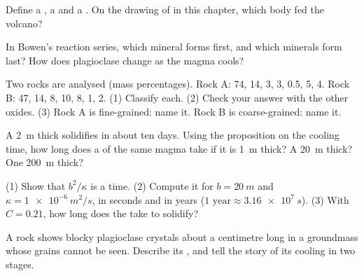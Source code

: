 \begin{exercise}[$\star$]\label{exo:g11:igneous-rocks:4}
Define a , a  and a . On the drawing of  in this
chapter, which body fed the volcano?
\end{exercise}

\begin{exercise}[$\star$]\label{exo:g11:igneous-rocks:5}
In Bowen's reaction series, which mineral forms first, and which minerals
form last? How does plagioclase change as the magma cools?
\end{exercise}

\begin{exercise}[$\star\star$]\label{exo:g11:igneous-rocks:6}
Two rocks are analysed (mass percentages). Rock A:  74, 
14,  3,  3,  0.5,  5,  4. Rock B:
 47,  14,  8,  10,  8, 
1,  2. (1) Classify each. (2) Check your answer with the other
oxides. (3) Rock A is fine-grained: name it. Rock B is coarse-grained: name
it.
\end{exercise}

\begin{exercise}[$\star\star$]\label{exo:g11:igneous-rocks:7}
A  \qty{2}{m} thick solidifies in about ten days. Using the proposition
on the cooling time, how long does a  of the same magma take if it is
\qty{1}{m} thick? A  \qty{20}{m} thick? One \qty{200}{m} thick?
\end{exercise}

\begin{exercise}[$\star\star$]\label{exo:g11:igneous-rocks:8}
(1) Show that $b^2/\kappa$ is a time. (2) Compute it for $b = \qty{20}{m}$
and $\kappa = \qty{1e-6}{m^2/s}$, in seconds and in years
($\num{1}\text{ year} \approx \qty{3.16e7}{s}$). (3) With $C = 0.21$, how long
does the  take to solidify?
\end{exercise}

\begin{exercise}[$\star\star$]\label{exo:g11:igneous-rocks:9}
A rock shows blocky plagioclase crystals about a centimetre long in a
groundmass whose grains cannot be seen. Describe its , and tell the
story of its cooling in two stages.
\end{exercise}

